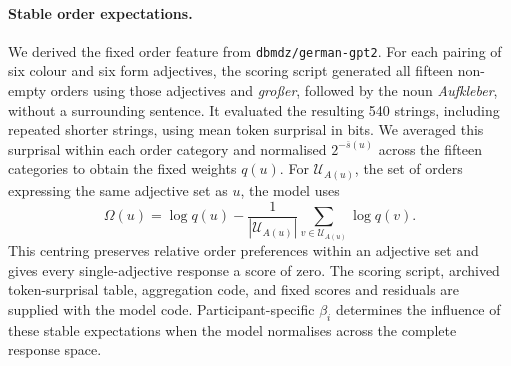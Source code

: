 \documentclass[10pt,a4paper,fleqn]{article}
\begin{document}
\paragraph{Stable order expectations.}
We derived the fixed order feature from \texttt{dbmdz/german-gpt2}.
For each pairing of six colour and six form adjectives, the scoring script generated all fifteen non-empty orders using those adjectives and \emph{großer}, followed by the noun \emph{Aufkleber}, without a surrounding sentence.
It evaluated the resulting 540 strings, including repeated shorter strings, using mean token surprisal in bits.
We averaged this surprisal within each order category and normalised $2^{-\overline{s}(u)}$ across the fifteen categories to obtain the fixed weights $q(u)$.
For $\mathcal U_{A(u)}$, the set of orders expressing the same adjective set as $u$, the model uses
\begin{equation}
 \Omega(u)=\log q(u)-\frac{1}{|\mathcal U_{A(u)}|}
 \sum_{v\in\mathcal U_{A(u)}}\log q(v).
 \label{eq:order-residual}
\end{equation}
This centring preserves relative order preferences within an adjective set and gives every single-adjective response a score of zero.
The scoring script, archived token-surprisal table, aggregation code, and fixed scores and residuals are supplied with the model code.
Participant-specific $\beta_i$ determines the influence of these stable expectations when the model normalises across the complete response space.
\end{document}
